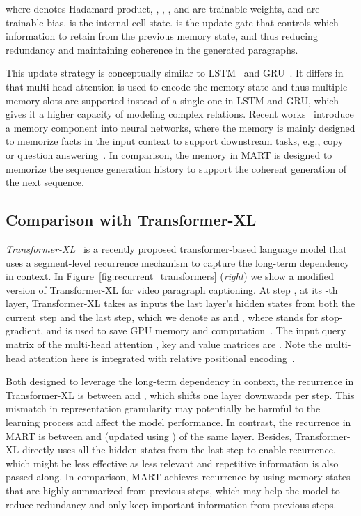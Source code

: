 \documentclass[11pt,a4paper]{article}
\begin{document}
\vspace{3pt}
\noindent where  denotes Hadamard product, , , , and  are trainable weights,  and  are trainable bias.  is the internal cell state. 
 is the update gate that controls which information to retain from the previous memory state, and thus reducing redundancy and maintaining coherence in the generated paragraphs. 

This update strategy is conceptually similar to LSTM~\cite{hochreiter1997long} and GRU~\cite{chung2014empirical}. 
It differs in that multi-head attention is used to encode the memory state and thus multiple memory slots are supported instead of a single one in LSTM and GRU, which gives it a higher capacity of modeling complex relations.
Recent works~\cite{sukhbaatar2015end,graves2014neural,xiong2016dynamic} introduce a memory component into neural networks, where the memory is mainly designed to memorize facts in the input context to support downstream tasks, e.g., copy~\cite{graves2014neural} or question answering~\cite{sukhbaatar2015end,xiong2016dynamic}. In comparison, the memory in MART is designed to memorize the sequence generation history to support the coherent generation of the next sequence.

\subsection{Comparison with Transformer-XL}\label{subsec:transformer-xl}
\textit{Transformer-XL}~\cite{dai2019transformer} is a recently proposed transformer-based language model that uses a segment-level recurrence mechanism to capture the long-term dependency in context. 
In Figure~\ref{fig:recurrent_transformers} (\textit{right}) we show a modified version of Transformer-XL for video paragraph captioning. 
At step , at its -th layer, Transformer-XL takes as inputs the last layer's hidden states from both the current step and the last step, which we denote as  and , where  stands for stop-gradient, and is used to save GPU memory and computation~\cite{dai2019transformer}.  
The input query matrix of the multi-head attention , key and value matrices are .  
Note the multi-head attention here is integrated with relative positional encoding~\cite{dai2019transformer}.


Both designed to leverage the long-term dependency in context, the recurrence in Transformer-XL is between  and , which shifts one layer downwards per step. 
This mismatch in representation granularity may potentially be harmful to the learning process and affect the model performance.
In contrast, the recurrence in MART is between  and  (updated using ) of the same layer.
Besides, Transformer-XL directly uses all the hidden states from the last step to enable recurrence, which might be less effective as less relevant and repetitive information is also passed along. 
In comparison, MART achieves recurrence by using memory states that are highly summarized from previous steps, which may help the model to reduce redundancy and only keep important information from previous steps.
\end{document}
